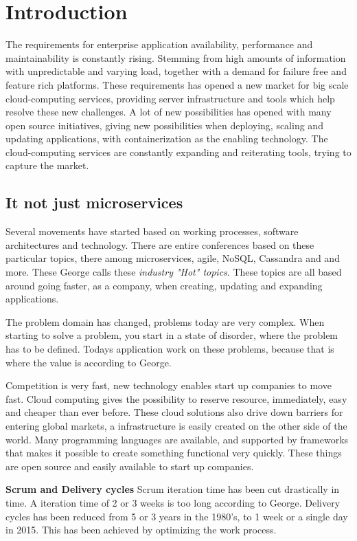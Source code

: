 \chapter{Introduction}
\label{ch:introduction}
The requirements for enterprise application availability, performance and maintainability is constantly rising. Stemming from high amounts of information with unpredictable and varying load, together with a demand for failure free and feature rich platforms. These requirements has opened a new market for big scale cloud-computing services, providing server infrastructure and tools which help resolve these new challenges. A lot of new possibilities has opened with many open source initiatives, giving new possibilities when deploying, scaling and updating applications, with containerization as the enabling technology. The cloud-computing services are constantly expanding and reiterating tools, trying to capture the market.


\section{It not just microservices}

Several movements have started based on working processes, software architectures and technology. There are entire conferences based on these particular topics, there among microservices, agile, NoSQL, Cassandra and and more. These George calls these \textit{industry "Hot" topics}. These topics are all based around going faster, as a company, when creating, updating and expanding applications. 

The problem domain has changed, problems today are very complex. When starting to solve a problem, you start in a state of disorder, where the problem has to be defined. Todays application work on these problems, because that is where the value is according to George.

Competition is very fast, new technology enables start up companies to move fast. Cloud computing gives the possibility to reserve resource, immediately, easy and cheaper than ever before. These cloud solutions also drive down barriers for entering global markets, a infrastructure is easily created on the other side of the world. Many programming languages are available, and supported by frameworks that makes it possible to create something functional very quickly. These things are open source and easily available to start up companies.

\textbf{Scrum and Delivery cycles}
Scrum iteration time has been cut drastically in time. A iteration time of 2 or 3 weeks is too long according to George. Delivery cycles has been reduced from 5 or 3 years in the 1980's, to 1 week or a single day in 2015. This has been achieved by optimizing the work process.

